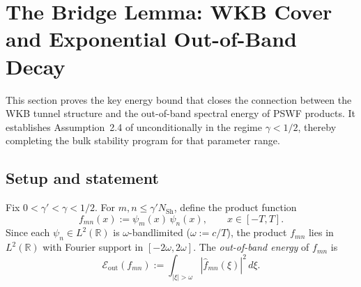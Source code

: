 
%
%
%

\section{The Bridge Lemma: WKB Cover and Exponential Out-of-Band
Decay}
\label{sec:bridge}

This section proves the key energy bound that closes the connection
between the WKB tunnel structure and the out-of-band spectral energy
of PSWF products. It establishes Assumption~2.4 of \cite{PaperIII}
unconditionally in the regime $\gamma < 1/2$, thereby completing the
bulk stability program for that parameter range.

\subsection{Setup and statement}
\label{subsec:bridge-setup}

Fix $0 < \gamma' < \gamma < 1/2$.
For $m, n \le \gamma' N_{\mathrm{Sh}}$, define the product function
\begin{equation}
\label{eq:bridge:fmn}
  f_{mn}(x) := \psi_m(x)\,\psi_n(x),
  \qquad x \in [-T, T].
\end{equation}
Since each $\psi_n \in L^2(\mathbb{R})$ is $\omega$-bandlimited
($\omega := c/T$), the product $f_{mn}$ lies in
$L^2(\mathbb{R})$ with Fourier support in $[-2\omega, 2\omega]$.
The \emph{out-of-band energy} of $f_{mn}$ is
\begin{equation}
\label{eq:bridge:Eout}
  \mathcal{E}_{\mathrm{out}}(f_{mn})
  := \int_{|\xi| > \omega} |\widehat{f}_{mn}(\xi)|^2\,d\xi.
\end{equation}

